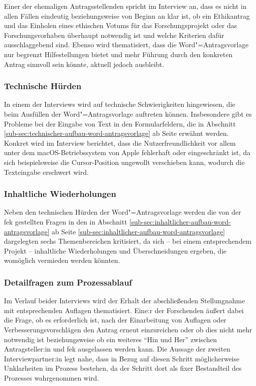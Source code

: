 \documentclass[a4paper,12pt,twoside]{scrreprt}
\begin{document}
Einer der ehemaligen Antragsstellenden spricht im Interview an, dass es nicht in allen Fällen eindeutig beziehungsweise von Beginn an klar ist, ob ein Ethikantrag und das Einholen eines ethischen Votums für das Forschungsprojekt oder das Forschungsvorhaben überhaupt notwendig ist und welche Kriterien dafür ausschlaggebend sind. Ebenso wird thematisiert, dass die Word"=Antragsvorlage nur begrenzt Hilfestellungen bietet und mehr Führung durch den konkreten Antrag sinnvoll sein könnte, aktuell jedoch ausbleibt.

\subsubsection*{Technische Hürden}
\label{sub-sub-sec:technische-hürden}

In einem der Interviews wird auf technische Schwierigkeiten hingewiesen, die beim Ausfüllen der Word"=Antragsvorlage auftreten können. Insbesondere gibt es Probleme bei der Eingabe von Text in den Formularfeldern, die in Abschnitt \ref{sub-sec:technischer-aufbau-word-antragsvorlage} ab Seite \pageref{sub-sec:technischer-aufbau-word-antragsvorlage} erwähnt werden. Konkret wird im Interview berichtet, dass die Nutzerfreundlichkeit vor allem unter dem macOS-Betriebssystem von Apple fehlerhaft oder eingeschränkt ist, da sich beispielsweise die Cursor-Position ungewollt verschieben kann, wodurch die Texteingabe erschwert wird.

\subsubsection*{Inhaltliche Wiederholungen}
\label{sub-sub-sec:inhaltliche-wiederholungen}

Neben den technischen Hürden der Word"=Antragsvorlage werden die von der \ac{fek} gestellten Fragen in den in Abschnitt \ref{sub-sec:inhaltlicher-aufbau-word-antragsvorlage} ab Seite \ref{sub-sec:inhaltlicher-aufbau-word-antragsvorlage} dargelegten sechs Themenbereichen kritisiert, da sich -- bei einem entsprechendem Projekt -- inhaltliche Wiederholungen und Überschneidungen ergeben, die womöglich vermieden werden könnten.

\subsubsection*{Detailfragen zum Prozessablauf}
\label{sub-sub-sec:detailfragen-prozessablauf}

Im Verlauf beider Interviews wird der Erhalt der abschließenden Stellungnahme mit entsprechenden Auflagen thematisiert. Eine:r der Forschenden äußert dabei die Frage, ob es erforderlich ist, nach der Einarbeitung von Auflagen oder Verbesserungsvorschlägen den Antrag erneut einzureichen oder ob dies nicht mehr notwendig ist beziehungsweise ob ein weiteres \enquote{Hin und Her} zwischen Antragsteller:in und \ac{fek} ausgelassen werden kann. Die Aussage der zweiten Interviewpartner:in legt nahe, dass in Bezug auf diesen Schritt möglicherweise Unklarheiten im Prozess bestehen, da der Schritt dort als fixer Bestandteil des Prozesses wahrgenommen wird.
\end{document}
